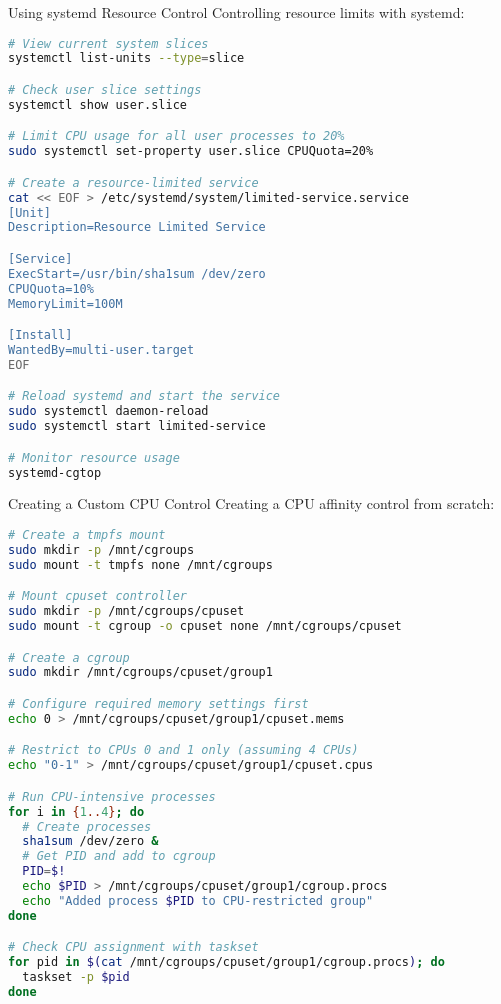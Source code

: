 \begin{example2}{Using systemd Resource Control}
    Controlling resource limits with systemd:
    
\begin{lstlisting}[language=bash, style=basesmol]
# View current system slices
systemctl list-units --type=slice

# Check user slice settings
systemctl show user.slice

# Limit CPU usage for all user processes to 20%
sudo systemctl set-property user.slice CPUQuota=20%

# Create a resource-limited service
cat << EOF > /etc/systemd/system/limited-service.service
[Unit]
Description=Resource Limited Service

[Service]
ExecStart=/usr/bin/sha1sum /dev/zero
CPUQuota=10%
MemoryLimit=100M

[Install]
WantedBy=multi-user.target
EOF

# Reload systemd and start the service
sudo systemctl daemon-reload
sudo systemctl start limited-service

# Monitor resource usage
systemd-cgtop
\end{lstlisting}
\end{example2}

\begin{example2}{Creating a Custom CPU Control}
    Creating a CPU affinity control from scratch:
    
\begin{lstlisting}[language=bash, style=basesmol]
# Create a tmpfs mount
sudo mkdir -p /mnt/cgroups
sudo mount -t tmpfs none /mnt/cgroups

# Mount cpuset controller
sudo mkdir -p /mnt/cgroups/cpuset
sudo mount -t cgroup -o cpuset none /mnt/cgroups/cpuset

# Create a cgroup
sudo mkdir /mnt/cgroups/cpuset/group1

# Configure required memory settings first
echo 0 > /mnt/cgroups/cpuset/group1/cpuset.mems

# Restrict to CPUs 0 and 1 only (assuming 4 CPUs)
echo "0-1" > /mnt/cgroups/cpuset/group1/cpuset.cpus

# Run CPU-intensive processes
for i in {1..4}; do
  # Create processes
  sha1sum /dev/zero &
  # Get PID and add to cgroup
  PID=$!
  echo $PID > /mnt/cgroups/cpuset/group1/cgroup.procs
  echo "Added process $PID to CPU-restricted group"
done

# Check CPU assignment with taskset
for pid in $(cat /mnt/cgroups/cpuset/group1/cgroup.procs); do
  taskset -p $pid
done
\end{lstlisting}
\end{example2}